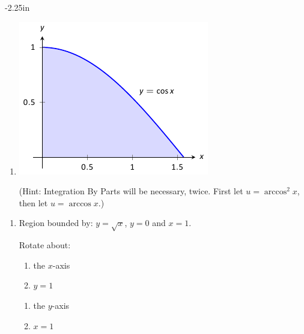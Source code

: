 \begin{adjustwidth*}{}{-2.25in}
\setlength{\columnsep}{25pt}
\begin{multicols*}{2}\small

\begin{enumerate}[1),start=11]
\item \begin{minipage}{\linewidth}\centering\includegraphics{figures/fig07_02_ex_11}\end{minipage}

(Hint: Integration By Parts will be necessary, twice. First let $u = \arccos^2x$, then let $u=\arccos x$.)
\end{enumerate}

\vspace{.25cm}


\begin{enumerate}[1),resume]
\item Region bounded by: $y=\sqrt{x}$, $y=0$ and $x=1$.

Rotate about:

\noindent%
\begin{minipage}[t]{.5\linewidth}
\begin{enumerate}
\item		the $x$-axis
\item		$y=1$
\end{enumerate}
\end{minipage}
\begin{minipage}[t]{.5\linewidth}
\begin{enumerate}\addtocounter{enumii}{2}
\item		the $y$-axis
\item		$x=1$
\end{enumerate}
\end{minipage}


\end{enumerate}
\end{multicols*}
\end{adjustwidth*}
